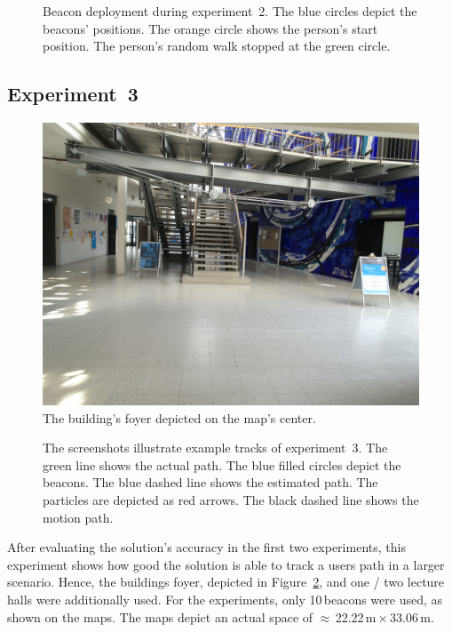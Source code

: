 \begin{figure}
	
	\caption{Beacon deployment during experiment~2. The blue circles depict the beacons' positions. The orange circle shows the person's start position. The person's random walk stopped at the green circle.}
	\label{fig:exp2_imgs}
\end{figure}


\subsection*{Experiment~3}
\begin{figure}
	\includegraphics[height=0.35\textheight]{figures/F-Foyer}
	\caption{The building's foyer depicted on the map's center.}
	\label{fig:f-foyer}
\end{figure}


\begin{figure}
	
	\caption{The screenshots illustrate example tracks of experiment~3. The green line shows the actual path. The blue filled circles depict the beacons. The blue dashed line shows the estimated path. The particles are depicted as red arrows. The black dashed line shows the motion path.}
	\label{fig:exp3_imgs}
\end{figure}

After evaluating the solution's accuracy in the first two experiments, this experiment shows how good the solution is able to track a users path in a larger scenario. Hence, the buildings foyer, depicted in Figure~\ref{fig:f-foyer}, and one / two lecture halls were additionally used. For the experiments, only 10\,beacons were used, as shown on the maps. The maps depict an actual space of $\approx$\,22.22\,m\,$\times$\,33.06\,m.

